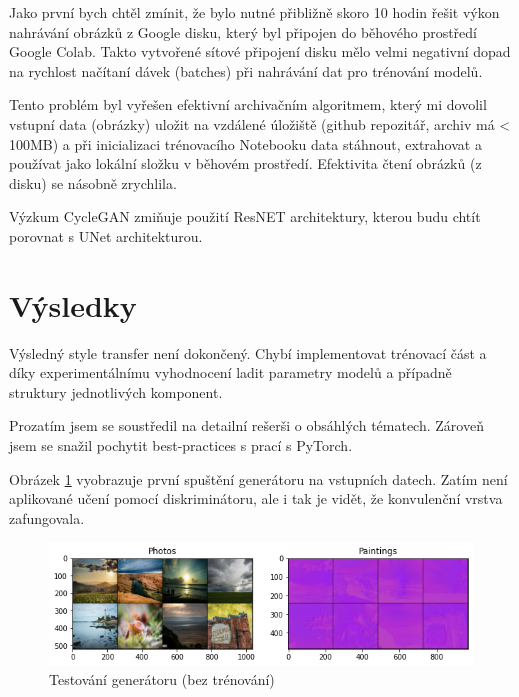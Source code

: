 \documentclass[czech]{mvi-report}
\begin{document}
Jako první bych chtěl zmínit, že bylo nutné přibližně skoro 10 hodin řešit výkon nahrávání obrázků z Google disku, který byl připojen do běhového prostředí Google Colab. Takto vytvořené sítové připojení disku mělo velmi negativní dopad na rychlost načítaní dávek (batches) při nahrávání dat pro trénování modelů.

Tento problém byl vyřešen efektivní archivačním algoritmem, který mi dovolil vstupní data (obrázky) uložit na vzdálené úložiště (github repozitář, archiv má < 100MB) a při inicializaci trénovacího Notebooku data stáhnout, extrahovat a používat jako lokální složku v běhovém prostředí. Efektivita čtení obrázků (z disku) se násobně zrychlila.

Výzkum CycleGAN zmiňuje použití ResNET architektury, kterou budu chtít porovnat s UNet architekturou.

\section{Výsledky}

Výsledný style transfer není dokončený. Chybí implementovat trénovací část a díky experimentálnímu vyhodnocení ladit parametry modelů a případně struktury jednotlivých komponent. 

Prozatím jsem se soustředil na detailní rešerši o obsáhlých tématech. Zároveň jsem se snažil pochytit best-practices s prací s PyTorch.

Obrázek \ref{fig:test-generator} vyobrazuje první spuštění generátoru na vstupních datech. Zatím není aplikované učení pomocí diskriminátoru, ale i tak je vidět, že konvulenční vrstva zafungovala. 

\begin{figure}[h]
  \centering\leavevmode
  \includegraphics[width=1\linewidth]{img/first_result_wip}\vskip-0.5cm
  \caption{Testování generátoru (bez trénování)}
  \label{fig:test-generator}
\end{figure}

\end{document}
